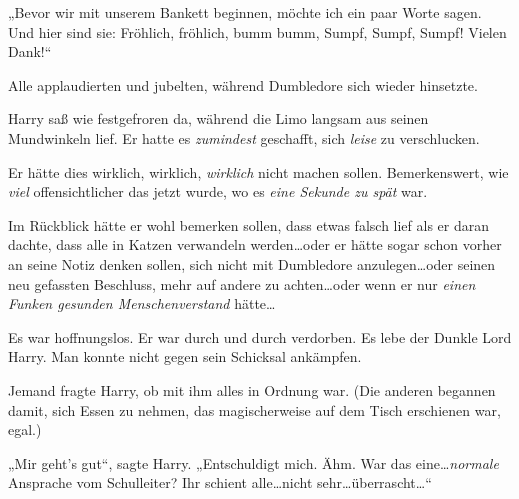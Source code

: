 „Bevor wir mit unserem Bankett beginnen, möchte ich ein paar Worte sagen. Und hier sind sie: Fröhlich, fröhlich, bumm bumm, Sumpf, Sumpf, Sumpf! Vielen Dank!“

Alle applaudierten und jubelten, während Dumbledore sich wieder hinsetzte.

Harry saß wie festgefroren da, während die Limo langsam aus seinen Mundwinkeln lief. Er hatte es \emph{zumindest} geschafft, sich \emph{leise} zu verschlucken.

Er hätte dies wirklich, wirklich, \emph{wirklich} nicht machen sollen. Bemerkenswert, wie \emph{viel} offensichtlicher das jetzt wurde, wo es \emph{eine Sekunde zu spät} war.

Im Rückblick hätte er wohl bemerken sollen, dass etwas falsch lief als er daran dachte, dass alle in Katzen verwandeln werden…oder er hätte sogar schon vorher an seine Notiz denken sollen, sich nicht mit Dumbledore anzulegen…oder seinen neu gefassten Beschluss, mehr auf andere zu achten…oder wenn er nur \emph{einen Funken gesunden Menschenverstand} hätte…

Es war hoffnungslos. Er war durch und durch verdorben. Es lebe der Dunkle Lord Harry. Man konnte nicht gegen sein Schicksal ankämpfen.

Jemand fragte Harry, ob mit ihm alles in Ordnung war. (Die anderen begannen damit, sich Essen zu nehmen, das magischerweise auf dem Tisch erschienen war, egal.)

„Mir geht's gut“, sagte Harry. „Entschuldigt mich. Ähm. War das eine…\emph{normale} Ansprache vom Schulleiter? Ihr schient alle…nicht sehr…überrascht…“


